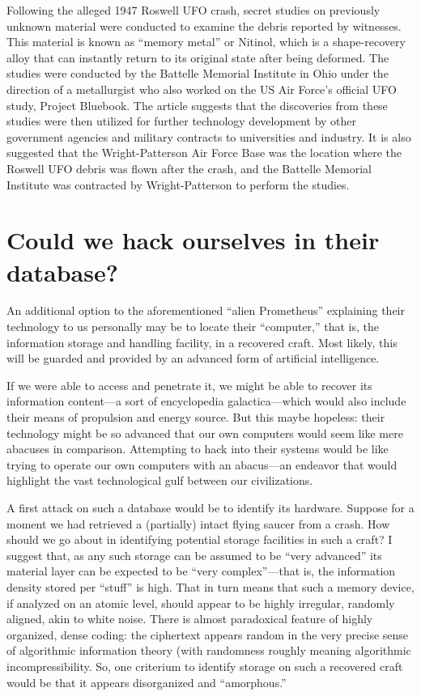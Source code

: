 Following the alleged 1947 Roswell UFO crash, secret studies on previously unknown material were conducted to examine the debris reported by witnesses. This material is known as ``memory metal'' or Nitinol, which is a shape-recovery alloy that can instantly return to its original state after being deformed. The studies were conducted by the Battelle Memorial Institute in Ohio under the direction of a metallurgist who also worked on the US Air Force's official UFO study, Project Bluebook. The article suggests that the discoveries from these studies were then utilized for further technology development by other government agencies and military contracts to universities and industry. It is also suggested that the Wright-Patterson Air Force Base was the location where the Roswell UFO debris was flown after the crash, and the Battelle Memorial Institute was contracted by Wright-Patterson to perform the studies.



\section{Could we hack ourselves in their database?}
\label{2023-UFO-part-Perception-crash-retreivals-hack}


An additional option to the aforementioned ``alien Prometheus'' explaining their technology to us personally may be to locate their ``computer,''
that is, the information storage and handling facility, in a recovered craft.
Most likely, this will be guarded and provided by an advanced form of artificial intelligence.

If we were able to access and penetrate it, we might be able to recover
its information content---a sort of encyclopedia galactica---which would also include their means of propulsion and energy source.
But this maybe hopeless: their technology might be so advanced that our own computers would seem like mere abacuses in comparison.
Attempting to hack into their systems would be like trying to operate our own computers with an abacus---an
endeavor that would highlight the vast technological gulf between our civilizations.

A first attack on such a database would be to identify its hardware. Suppose for a moment we had retrieved a (partially) intact flying saucer from a crash.
How should we go about in identifying potential storage facilities in such a craft?
I suggest that, as any such storage can be assumed to be ``very advanced'' its material layer can be expected to be ``very complex''---that is, the information density stored per ``stuff'' is high.
That in turn means that such a memory device, if analyzed on an atomic level, should appear to be highly irregular, randomly aligned, akin to white noise.
There is almost paradoxical feature of highly organized, dense coding: the ciphertext appears random in the
very precise sense of algorithmic information theory (with randomness roughly meaning algorithmic incompressibility.
So, one criterium to identify storage on such a recovered craft would be that it appears disorganized and ``amorphous.''


